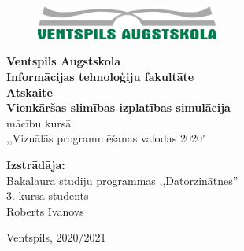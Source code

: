 
\begin{titlepage}
	\begin{center}
		\begin{figure}[ht]
			\centering
			\includegraphics[width=60mm]{images/vea_logo.png}
		\end{figure}
		\large
		\textbf{Ventspils Augstskola \\Informācijas tehnoloģiju fakultāte}
		\vspace*{4cm}
		\\
		\textbf{Atskaite} \\
		\LARGE
		\textbf{Vienkāršas slimības izplatības simulācija}
		\vspace{0.5cm}
		\large
		\\
		mācību kursā \\,,Vizuālās programmēšanas valodas 2020"
	\end{center}

	\vspace{2cm}

	\begin{flushright}
		\normalsize
		\textbf{Izstrādāja:}\\
		Bakalaura studiju programmas ,,Datorzinātnes”\\
		3. kursa students\\
		Roberts Ivanovs \\
	\end{flushright}

	\vfill

	\begin{center}
		\Large
		Ventspils, 2020/2021
	\end{center}

\end{titlepage}
